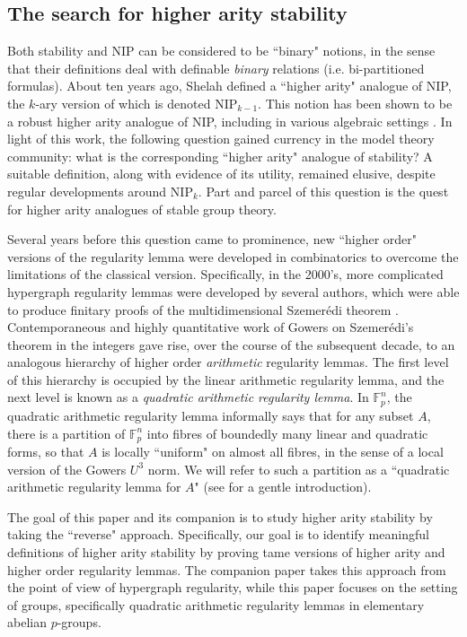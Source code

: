 \documentclass[12pt,oneside,british,a4wide]{amsart}
\numberwithin{equation}{section}
\theoremstyle{definition}
\def\F{\mathbb{F}}
\def\NIP{\mathrm{NIP}}
\begin{document}
\subsection{The search for higher arity stability} Both stability and NIP can be considered to be ``binary" notions, in the sense that their definitions deal with definable  \emph{binary} relations (i.e. bi-partitioned formulas). About ten years ago, Shelah \cite{Shelah.2017} defined a ``higher arity" analogue of NIP, the $k$-ary version of which is denoted $\NIP_{k-1}$. This notion has been shown to be a robust higher arity analogue of NIP, including in various algebraic settings  \cite{Shelah.2017,Chernikov.2021, Hempel.2014}. In light of this work, the following question gained currency in the model theory community: what is the corresponding ``higher arity" analogue of stability? A suitable definition, along with evidence of its utility, remained elusive, despite regular developments around $\NIP_k$. Part and parcel of this question is the quest for higher arity analogues of stable group theory.  


Several years before this question came to prominence, new ``higher order" versions of the regularity lemma were developed in combinatorics to overcome the limitations of the classical version.  Specifically, in the 2000's, more complicated hypergraph regularity lemmas were developed by several authors, which were able to produce finitary proofs  of the multidimensional Szemer\'{e}di theorem \cite{Gowers.2007,Frankl.2002, Nagle.2006, Rodl.2004}. Contemporaneous and highly quantitative work of Gowers on Szemer\'edi's theorem in the integers \cite{Gowers.1998, Gowers.2001} gave rise, over the course of the subsequent decade, to an analogous hierarchy of higher order \emph{arithmetic} regularity lemmas. The first level of this hierarchy is occupied by the linear arithmetic regularity lemma, and the next level is known as a \emph{quadratic arithmetic regularity lemma}.  In $\F_p^n$, the quadratic arithmetic regularity lemma  informally says that for any subset $A$, there is a partition of $\F_p^n$ into fibres of boundedly many linear and quadratic forms,  so that $A$ is locally ``uniform" on almost all fibres, in the sense of a local version of the Gowers $U^3$ norm.  We will refer to such a partition as a ``quadratic arithmetic regularity lemma for $A$" (see \cite{Terry.2021d} for a gentle introduction). 


The goal of this paper and its companion \cite{Terry.2021b} is to study higher arity stability by taking the  ``reverse" approach. Specifically, our goal is to identify meaningful definitions of higher arity stability by proving tame versions of higher arity and higher order regularity lemmas.  The companion paper \cite{Terry.2021b} takes this approach from the point of view of hypergraph regularity, while this paper focuses on the setting of groups, specifically quadratic arithmetic regularity lemmas in elementary abelian $p$-groups. 
\end{document}
